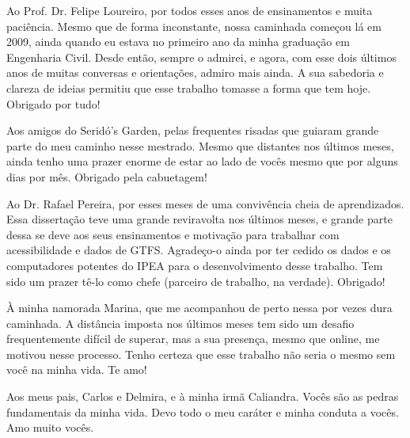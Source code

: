 
Ao Prof. Dr. Felipe Loureiro, por todos esses anos de ensinamentos e muita paciência. Mesmo que de forma inconstante, nossa caminhada começou lá em 2009, ainda quando eu estava no primeiro ano da minha graduação em Engenharia Civil. Desde então, sempre o admirei, e agora, com esse dois últimos anos de muitas conversas e orientações, admiro mais ainda. A sua sabedoria e clareza de ideias permitiu que esse trabalho tomasse a forma que tem hoje. Obrigado por tudo!

Aos amigos do Seridó's Garden, pelas frequentes risadas que guiaram grande parte do meu caminho nesse mestrado. Mesmo que distantes nos últimos meses, ainda tenho uma prazer enorme de estar ao lado de vocês mesmo que por alguns dias por mês. Obrigado pela cabuetagem!

Ao Dr. Rafael Pereira, por esses meses de uma convivência cheia de aprendizados. Essa dissertação teve uma grande reviravolta nos últimos meses, e grande parte dessa se deve aos seus ensinamentos e motivação para trabalhar com acessibilidade e dados de GTFS. Agradeço-o ainda por ter cedido os dados e os computadores potentes do IPEA para o desenvolvimento desse trabalho. Tem sido um prazer tê-lo como chefe (parceiro de trabalho, na verdade). Obrigado!

À minha namorada Marina, que me acompanhou de perto nessa por vezes dura caminhada. A distância imposta nos últimos meses tem sido um desafio frequentemente difícil de superar, mas a sua presença, mesmo que online, me motivou nesse processo. Tenho certeza que esse trabalho não seria o mesmo sem você na minha vida. Te amo! 

Aos meus pais, Carlos e Delmira, e à minha irmã Caliandra. Vocês são as pedras fundamentais da minha vida. Devo todo o meu caráter e minha conduta a vocês. Amo muito vocês. 



